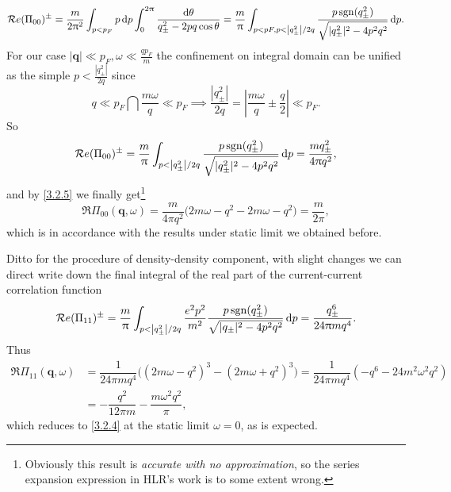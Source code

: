 \documentclass[bachelor,english,numbers]{ustcthesis}
\begin{document}
		\begin{equation*}
			\mathop{\mathcal{R}e} (\Pi_{00})^{\pm}=\dfrac{m}{2\uppi^2}\int_{p<p_F}p\mathop{}\!\mathrm{d} p\int_0^{2\uppi}\dfrac{\mathop{}\!\mathrm{d}\theta}{q^2_\pm-2p q\cos\theta}=\dfrac{m}{\uppi}\int_{p<pF, p<\left|q_{\pm}^2\right|/2q}\dfrac{p\mathop{\rm sgn}(q_{\pm}^2)}{\sqrt{|q_{\pm}^2|^2-4p^2q^2}}\mathop{}\!\mathrm{d} p.
		\end{equation*}
		For our case $|\bm{q}|\ll p_F, \omega\ll\frac{q p_F}{m}$ the confinement on integral domain can be unified as the simple $p<\frac{|q_{\pm}^2|}{2q}$ since
		\begin{equation*}
			q\ll p_F\bigcap\dfrac{m\omega}{q}\ll p_F\implies\dfrac{|q_{\pm}^2|}{2q}=\left|\dfrac{m\omega}{q}\pm\dfrac{q}{2}\right|\ll p_F.
		\end{equation*}
		So
		\begin{equation}\label{3.2.6}
			\mathop{\mathcal{R}e} (\Pi_{00})^{\pm}=\dfrac{m}{\uppi}\int_{p<\left|q_{\pm}^2\right|/2q}\dfrac{p\mathop{\rm sgn}(q_{\pm}^2)}{\sqrt{|q_{\pm}^2|^2-4p^2q^2}}\mathop{}\!\mathrm{d} p=\dfrac{mq_{\pm}^2}{4\uppi q^2},
		\end{equation}
		and by \eqref{3.2.5} we finally get\footnote{Obviously this result is \emph{accurate with no approximation}, so the series expansion expression in HLR's work is to some extent wrong.}
		\begin{equation}\label{3.2.7}
			\Re \Pi_{00}(\bm{q},\omega)=\dfrac{m}{4\pi q^2}\bigg(2m\omega-q^2-2m\omega-q^2\bigg)=\dfrac{m}{2\pi},
		\end{equation}
		which is in accordance with the results under static limit we obtained before.\par
		Ditto for the procedure of density-density component, with slight changes we can direct write down the final integral of the real part of the current-current correlation function
		\begin{equation}
			\mathop{\mathcal{R}e} (\Pi_{11})^{\pm}=\dfrac{m}{\uppi}\int_{p<\left|q_{\pm}^2\right|/2q}\dfrac{e^2p^2}{m^2}\dfrac{p\mathop{\rm sgn}(q_{\pm}^2)}{\sqrt{|q_{\pm}|^2-4p^2q^2}}\mathop{}\!\mathrm{d} p=\dfrac{q_{\pm}^6}{24\uppi mq^4}.\label{3.2.8}
		\end{equation}
		Thus
		\begin{align}\label{3.2.9}
			\Re \Pi_{11}(\bm{q},\omega)&=\dfrac{1}{24\pi mq^4}\bigg((2m\omega-q^2)^3-(2m\omega+q^2)^3\bigg)=\dfrac{1}{24\pi mq^4}(-q^6-24m^2\omega^2 q^2)\nonumber\\
			&=-\dfrac{q^2}{12\pi m}-\dfrac{m\omega^2q^2}{\pi},
		\end{align}
		which reduces to \eqref{3.2.4} at the static limit $\omega=0$, as is expected.
	
\end{document}
